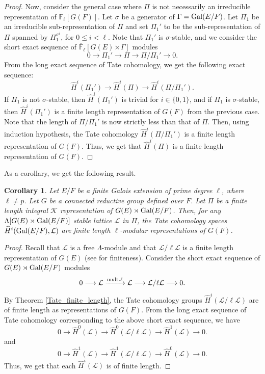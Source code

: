 \documentclass[10pt, reqno]{amsart}
\theoremstyle{plain}
\numberwithin{equation}{section} \newcommand{\di}{\operatorname{dim}}
\newtheorem{corollary}[theorem]{Corollary}
\begin{document}
\begin{proof}
Now, consider the general case where $\Pi$ is not necessarily an
irreducible representation of $\overline{\mathbb{F}}_\ell[G(F)]$.
Let $\sigma$ be a generator of $\Gamma={\rm Gal}(E/F)$. 
Let
$\Pi_1$ be an irreducible sub-representation of $\Pi$ and set 
$\Pi_1'$ to be the sub-representation of $\Pi$ spanned by
$\Pi_1^{\sigma^i}$, for $0\leq i<\ell$. Note that $\Pi_1'$ is
$\sigma$-stable, and we consider the short exact
sequence of
$\overline{\mathbb{F}}_\ell[G(E)\rtimes \Gamma]$ modules
$$ 0\longrightarrow \Pi_1'\longrightarrow \Pi\longrightarrow \Pi/
\Pi_1'\longrightarrow 0. $$
From the long exact sequence of Tate cohomology, we get the following
exact sequence:
$$\widehat{H}^i(\Pi_1')\rightarrow
\widehat{H}^i(\Pi)\rightarrow \widehat{H}^i(\Pi/\Pi_1').$$
If $\Pi_1$ is not $\sigma$-stable, then $\widehat{H}^i(\Pi_1')$ is
trivial for $i\in \{0,1\}$, and if $\Pi_1$ is $\sigma$-stable, then
$\widehat{H}^i(\Pi_1')$ is a finite length representation of $G(F)$
from the previous case.  
Note that the length of $\Pi/\Pi_1'$ is now strictly less than that of
$\Pi$. Then, using induction hypothesis, the Tate cohomology
$\widehat{H}^i(\Pi/\Pi_1')$ is a finite length
representation of $G(F)$. Thus, we get that $\widehat{H}^i(\Pi)$ is a
finite length representation of $G(F)$.
\end{proof}
As a corollary, we get the following result.
\begin{corollary}
  Let $E/F$ be a finite Galois extension of prime degree $\ell$, where
  $\ell\ne p$. Let $G$ be a connected reductive group defined over
  $F$. Let $\Pi$ be a finite length integral $\mathcal{K}$
  representation of $G(E)\rtimes {\rm Gal}(E/F)$. Then, for any
  $\Lambda[G(E)\rtimes {\rm Gal}(E/F)]$ stable lattice $\mathcal{L}$
  in $\Pi$, the Tate cohomology spaces
  $\widehat{H}^i({\rm Gal}(E/F), \mathcal{L})$ are finite length
  $\ell$-modular representations of $G(F)$.
\end{corollary}
\begin{proof}
Recall that $\mathcal{L}$ is a free $\Lambda$-module and that
$\mathcal{L}/\ell\mathcal{L}$ is a finite length representation of $G(E)$
(see \cite[II.5.11.a]{Vigneras_modl_book} for finiteness). Consider the short
exact sequence of $G(E)\rtimes{\rm Gal}(E/F)$ modules
$$ 0\longrightarrow \mathcal{L}
\xrightarrow{{\rm mult.}\ell}
\mathcal{L}\longrightarrow \mathcal{L}/\ell\mathcal{L}
\longrightarrow 0. $$ 
By Theorem \ref{Tate_finite_length}, the Tate cohomology groups
$\widehat{H}^i(\mathcal{L}/\ell\mathcal{L})$ are of finite length as
representations of $G(F)$. From the long exact
sequence of Tate cohomology corresponding to the above short exact
sequence, we have
$$ 0\rightarrow \widehat{H}^0(\mathcal{L})\rightarrow
\widehat{H}^0(\mathcal{L}/\ell\mathcal{L})
\rightarrow
\widehat{H}^1(\mathcal{L})\rightarrow 0. $$
and 
$$ 0\rightarrow \widehat{H}^1(\mathcal{L})\rightarrow
\widehat{H}^1(\mathcal{L}/\ell\mathcal{L})\rightarrow
\widehat{H}^0(\mathcal{L})\rightarrow 0. $$
Thus, we get that each
$\widehat{H}^i(\mathcal{L})$ is of finite length.
\end{proof}
\end{document}
